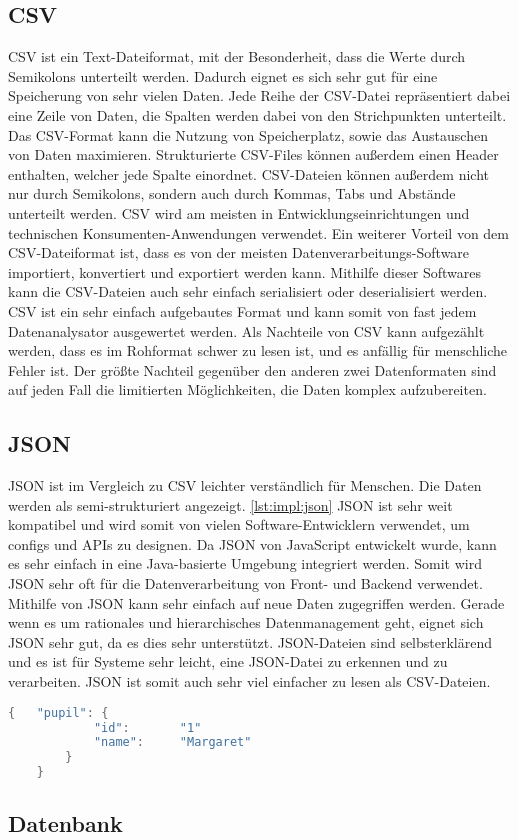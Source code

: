 \subsection{CSV}
CSV ist ein Text-Dateiformat, mit der Besonderheit, dass die Werte durch Semikolons unterteilt werden. Dadurch eignet es sich sehr gut für eine Speicherung von sehr vielen Daten. Jede Reihe der CSV-Datei repräsentiert dabei eine Zeile von Daten, die Spalten werden dabei von den Strichpunkten unterteilt. Das CSV-Format kann die Nutzung von Speicherplatz, sowie das Austauschen von Daten maximieren. Strukturierte CSV-Files können außerdem einen Header enthalten, welcher jede Spalte einordnet. CSV-Dateien können außerdem nicht nur durch Semikolons, sondern auch durch Kommas, Tabs und Abstände unterteilt werden. CSV wird am meisten in Entwicklungseinrichtungen und technischen Konsumenten-Anwendungen verwendet. Ein weiterer Vorteil von dem CSV-Dateiformat ist, dass es von der meisten Datenverarbeitungs-Software importiert, konvertiert und exportiert werden kann. Mithilfe dieser Softwares kann die CSV-Dateien auch sehr einfach serialisiert oder deserialisiert werden. CSV ist ein sehr einfach aufgebautes Format und kann somit von fast jedem Datenanalysator ausgewertet werden. Als Nachteile von CSV kann aufgezählt werden, dass es im Rohformat schwer zu lesen ist, und es anfällig für menschliche Fehler ist. Der größte Nachteil gegenüber den anderen zwei Datenformaten sind auf jeden Fall die limitierten Möglichkeiten, die Daten komplex aufzubereiten.   


\subsection{JSON}
JSON ist im Vergleich zu CSV leichter verständlich für Menschen. Die Daten werden als semi-strukturiert angezeigt. \ref{lst:impl:json} JSON ist sehr weit kompatibel und wird somit von vielen Software-Entwicklern verwendet, um configs und APIs zu designen. Da JSON von JavaScript entwickelt wurde, kann es sehr einfach in eine Java-basierte Umgebung integriert werden. Somit wird JSON sehr oft für die Datenverarbeitung von Front- und Backend verwendet. Mithilfe von JSON kann sehr einfach auf neue Daten zugegriffen werden. Gerade wenn es um rationales und hierarchisches Datenmanagement geht, eignet sich JSON sehr gut, da es dies sehr unterstützt. JSON-Dateien sind selbsterklärend und es ist für Systeme sehr leicht, eine JSON-Datei zu erkennen und zu verarbeiten. JSON ist somit auch sehr viel einfacher zu lesen als CSV-Dateien. 


\begin{lstlisting}[language=java,caption=JSON Beispiel,label=lst:impl:json]
    {   "pupil": {
            "id":       "1"
            "name":     "Margaret"
        }
    }
\end{lstlisting}

\subsection{Datenbank}